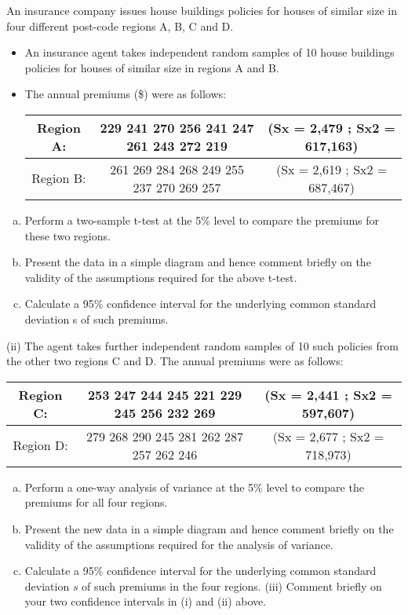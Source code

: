 \documentclass[a4paper,12pt]{article}
\begin{document}
An insurance company issues house buildings policies for houses of similar
size in four different post-code regions A, B, C and D.
\begin{itemize}
\item  An insurance agent takes independent random samples of 10 house
buildings policies for houses of similar size in regions A and B.
\item The
annual premiums (\$) were as follows:

\begin{center}
 \begin{tabular}{c|c|c}\hline
Region A: & 229 241 270 256 241 247 261 243 272 219
& (Sx = 2,479 ; Sx2 = 617,163)\\  \hline
Region B: & 261 269 284 268 249 255 237 270 269 257
& (Sx = 2,619 ; Sx2 = 687,467)\\  \hline
\end{tabular}   
\end{center}

\end{itemize}
\begin{enumerate}[(a)]
\item Perform a two-sample t-test at the 5\% level to compare the
premiums for these two regions.
\item Present the data in a simple diagram and hence comment briefly
on the validity of the assumptions required for the above t-test.
\item Calculate a 95\% confidence interval for the underlying common
standard deviation s of such premiums. 
\end{enumerate}
(ii) The agent takes further independent random samples of 10 such
policies from the other two regions C and D. The annual premiums
were as follows:
\begin{center}
 \begin{tabular}{c|c|c}\hline
Region C: & 253 247 244 245 221 229 245 256 232 269
& (Sx = 2,441 ; Sx2 = 597,607)\\  \hline
Region D:&  279 268 290 245 281 262 287 257 262 246
& (Sx = 2,677 ; Sx2 = 718,973)\\  \hline
\end{tabular}   
\end{center}


\begin{enumerate}[(a)]
\item Perform a one-way analysis of variance at the 5\% level to
compare the premiums for all four regions.
\item Present the new data in a simple diagram and hence comment
briefly on the validity of the assumptions required for the
analysis of variance.
\item Calculate a 95\% confidence interval for the underlying common
standard deviation $s$ of such premiums in the four regions. 
(iii) Comment briefly on your two confidence intervals in (i) and (ii)
above. 
\end{enumerate}
\end{document}
